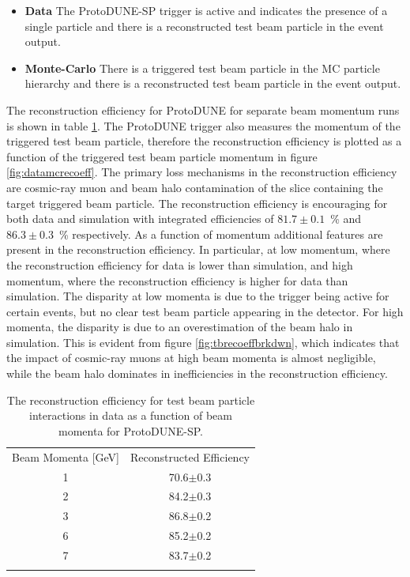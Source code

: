 \begin{itemize}
\item \textbf{Data} The ProtoDUNE-SP trigger is active and indicates the presence of a single particle and there is a reconstructed test beam particle in the event output.
\item \textbf{Monte-Carlo} There is a triggered test beam particle in the MC particle hierarchy and there is a reconstructed test beam particle in the event output.
\end{itemize}

The reconstruction efficiency for ProtoDUNE for separate beam momentum runs is shown in table \ref{tab:dataeff}.  The ProtoDUNE trigger also measures the momentum of the triggered test beam particle, therefore the reconstruction efficiency is plotted as a function of the triggered test beam particle momentum in figure \ref{fig:datamcrecoeff}.  The primary loss mechanisms in the reconstruction efficiency are cosmic-ray muon and beam halo contamination of the slice containing the target triggered beam particle.  The reconstruction efficiency is encouraging for both data and simulation with integrated efficiencies of $81.7 \pm 0.1$~\% and $86.3 \pm 0.3$~\% respectively.  As a function of momentum additional features are present in the reconstruction efficiency.  In particular, at low momentum, where the reconstruction efficiency for data is lower than simulation, and high momentum, where the reconstruction efficiency is higher for data than simulation.  The disparity at low momenta is due to the trigger being active for certain events, but no clear test beam particle appearing in the detector.   For high momenta, the disparity is due to an overestimation of the beam halo in simulation.  This is evident from figure \ref{fig:tbrecoeffbrkdwn}, which indicates that the impact of cosmic-ray muons at high beam momenta is almost negligible, while the beam halo dominates in inefficiencies in the reconstruction efficiency.  

\begin{table}
\centering
\caption{The reconstruction efficiency for test beam particle interactions in data as a function of beam momenta for ProtoDUNE-SP.}
\label{tab:dataeff} 
\begin{tabular}{cc}
\hline\noalign{\smallskip}
Beam Momenta [GeV] & Reconstructed Efficiency  \\
\noalign{\smallskip}\hline\noalign{\smallskip}
1 & 70.6$\pm$0.3 \\
2 & 84.2$\pm$0.3 \\
3 & 86.8$\pm$0.2 \\
6 & 85.2$\pm$0.2 \\
7 & 83.7$\pm$0.2 \\
\noalign{\smallskip}\hline
\end{tabular}
\end{table}

